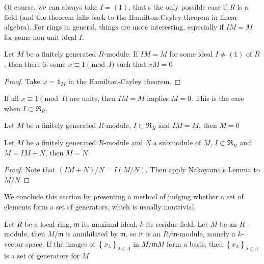 \documentclass{note-eng}
\begin{document}
Of course, we can always take $I = (1)$, that's the only possible case if $R$ is a field (and the theorem falls back to the Hamilton-Cayley theorem in linear algebra). For rings in general, things are more interesting, especially if $IM = M$ for some non-unit ideal $I$.

\begin{corollary}
    Let $M$ be a finitely generated $R$-module. If $IM = M$ for some ideal $I \ne (1)$ of $R$, then there is some $x \equiv 1 \pmod{I}$ such that $xM = 0$
\end{corollary}

\begin{proof}
    Take $\varphi = \mathds{1}_M$ in the Hamilton-Cayley theorem.
\end{proof}

\iffalse

If all $x \equiv 1 \pmod{I}$ are units, then $IM = M$ implies $M = 0$. This is the case when $I \subset \mathfrak{R}_R$.

\begin{theorem}
    Let $M$ be a finitely generated $R$-module, $I \subset \mathfrak{R}_R$ and $IM = M$, then $M = 0$
\end{theorem}

\begin{corollary}
    Let $M$ be a finitely generated $R$-module and $N$ a submodule of $M$, $I \subset \mathfrak{R}_R$ and $M = IM + N$, then $M = N$
\end{corollary}

\begin{proof}
    Note that $(IM + N) / N = I(M / N)$. Then apply Nakayama's Lemma to $M / N$
\end{proof}

We conclude this section by presenting a method of judging whether a set of elements form a set of generators, which is usually nontrivial.

\begin{proposition}
    Let $R$ be a local ring, $\mathfrak{m}$ its maximal ideal, $k$ its residue field. Let $M$ be an $R$-module, then $M / \mathfrak{m}$ is annihilated by $\mathfrak{m}$, so it is an $R / \mathfrak{m}$-module, namely a $k$-vector space. If the images of $\left\lbrace x_\lambda \right\rbrace_{\lambda \in \Lambda}$ in $M / \mathfrak{m}M$ form a basis, then $\left\lbrace x_{\lambda} \right\rbrace_{\lambda \in \Lambda}$ is a set of generators for $M$
\end{proposition}
\end{document}
